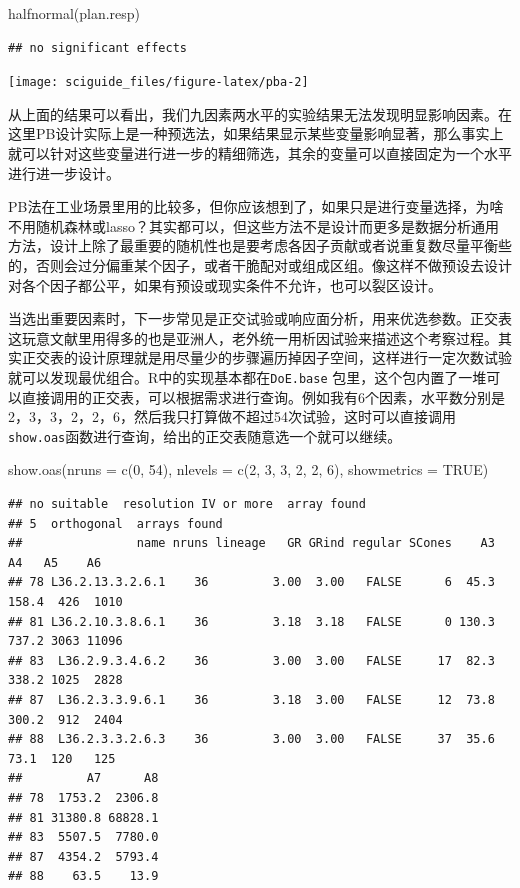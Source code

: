 \documentclass[]{tufte-book}
\newenvironment{Shaded}{}{}
\newcommand{\AttributeTok}[1]{\textcolor[rgb]{0.49,0.56,0.16}{#1}}
\newcommand{\ConstantTok}[1]{\textcolor[rgb]{0.53,0.00,0.00}{#1}}
\newcommand{\DecValTok}[1]{\textcolor[rgb]{0.25,0.63,0.44}{#1}}
\newcommand{\FunctionTok}[1]{\textcolor[rgb]{0.02,0.16,0.49}{#1}}
\newcommand{\NormalTok}[1]{#1}
\begin{document}
\begin{Shaded}
\begin{Highlighting}[]
\FunctionTok{halfnormal}\NormalTok{(plan.resp)}
\end{Highlighting}
\end{Shaded}

\begin{verbatim}
## no significant effects
\end{verbatim}

\texttt{[image: sciguide\_files/figure-latex/pba-2]}

从上面的结果可以看出，我们九因素两水平的实验结果无法发现明显影响因素。在这里PB设计实际上是一种预选法，如果结果显示某些变量影响显著，那么事实上就可以针对这些变量进行进一步的精细筛选，其余的变量可以直接固定为一个水平进行进一步设计。

PB法在工业场景里用的比较多，但你应该想到了，如果只是进行变量选择，为啥不用随机森林或lasso？其实都可以，但这些方法不是设计而更多是数据分析通用方法，设计上除了最重要的随机性也是要考虑各因子贡献或者说重复数尽量平衡些的，否则会过分偏重某个因子，或者干脆配对或组成区组。像这样不做预设去设计对各个因子都公平，如果有预设或现实条件不允许，也可以裂区设计。

当选出重要因素时，下一步常见是正交试验或响应面分析，用来优选参数。正交表这玩意文献里用得多的也是亚洲人，老外统一用析因试验来描述这个考察过程。其实正交表的设计原理就是用尽量少的步骤遍历掉因子空间，这样进行一定次数试验就可以发现最优组合。R中的实现基本都在\texttt{DoE.base} 包里，这个包内置了一堆可以直接调用的正交表，可以根据需求进行查询。例如我有6个因素，水平数分别是2，3，3，2，2，6，然后我只打算做不超过54次试验，这时可以直接调用\texttt{show.oas}函数进行查询，给出的正交表随意选一个就可以继续。

\begin{Shaded}
\begin{Highlighting}[]
\FunctionTok{show.oas}\NormalTok{(}\AttributeTok{nruns =} \FunctionTok{c}\NormalTok{(}\DecValTok{0}\NormalTok{, }\DecValTok{54}\NormalTok{), }\AttributeTok{nlevels =} \FunctionTok{c}\NormalTok{(}\DecValTok{2}\NormalTok{, }\DecValTok{3}\NormalTok{, }\DecValTok{3}\NormalTok{, }\DecValTok{2}\NormalTok{, }\DecValTok{2}\NormalTok{, }\DecValTok{6}\NormalTok{), }\AttributeTok{showmetrics =} \ConstantTok{TRUE}\NormalTok{)}
\end{Highlighting}
\end{Shaded}

\begin{verbatim}
## no suitable  resolution IV or more  array found
## 5  orthogonal  arrays found
##                name nruns lineage   GR GRind regular SCones    A3    A4   A5    A6
## 78 L36.2.13.3.2.6.1    36         3.00  3.00   FALSE      6  45.3 158.4  426  1010
## 81 L36.2.10.3.8.6.1    36         3.18  3.18   FALSE      0 130.3 737.2 3063 11096
## 83  L36.2.9.3.4.6.2    36         3.00  3.00   FALSE     17  82.3 338.2 1025  2828
## 87  L36.2.3.3.9.6.1    36         3.18  3.00   FALSE     12  73.8 300.2  912  2404
## 88  L36.2.3.3.2.6.3    36         3.00  3.00   FALSE     37  35.6  73.1  120   125
##         A7      A8
## 78  1753.2  2306.8
## 81 31380.8 68828.1
## 83  5507.5  7780.0
## 87  4354.2  5793.4
## 88    63.5    13.9
\end{verbatim}
\end{document}
